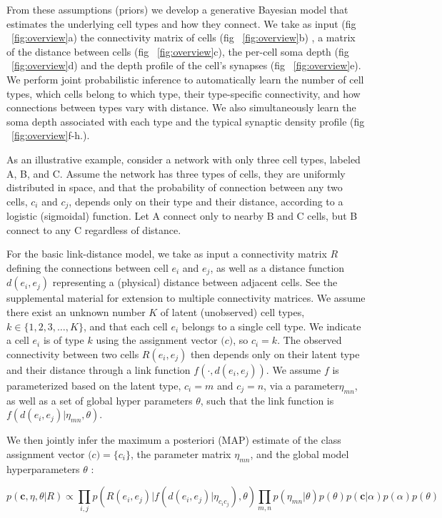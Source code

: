 \documentclass{article}
\renewcommand{\vec}[1]{\mathbf{#1}}
\begin{document}
From these assumptions (priors) we develop a generative Bayesian model
that estimates the underlying cell types and how they connect. We take
as input (fig ~\ref{fig:overview}a) the connectivity matrix of cells
(fig ~\ref{fig:overview}b) , a matrix of the distance between cells
(fig ~\ref{fig:overview}c), the per-cell soma depth (fig
~\ref{fig:overview}d) and the depth profile of the cell's synapses
(fig ~\ref{fig:overview}e). We perform joint probabilistic inference
to automatically learn the number of cell types, which cells belong to
which type, their type-specific connectivity, and how connections
between types vary with distance. We also simultaneously learn the
soma depth associated with each type and the typical synaptic density
profile (fig ~\ref{fig:overview}f-h.).


As an illustrative example, consider a network with only three cell
types, labeled A, B, and C. Assume the network has three types of
cells, they are uniformly distributed in space, and that the
probability of connection between any two cells, $c_i$ and $c_j$,
depends only on their type and their distance, according to a logistic
(sigmoidal) function. Let A connect only to nearby B and C cells, but B
connect to any C regardless of distance. 


For the basic link-distance model, we take as input a connectivity
matrix $R$ defining the connections between cell $e_i$ and $e_j$, as
well as a distance function $d(e_i, e_j)$ representing a (physical)
distance between adjacent cells.  See
the supplemental material for extension to multiple connectivity
matrices. We assume there exist an unknown number $K$ of latent
(unobserved) cell types, $k \in \{1, 2, 3, \dots, K\}$, and that each
cell $e_i$ belongs to a single cell type. We indicate a cell $e_i$ is
of type $k$ using the assignment vector $\vec(c)$, so $c_i = k$. The
observed connectivity between two cells $R(e_i, e_j)$ then depends
only on their latent type and their distance through a link function
$f(\cdot, d(e_i, e_j))$. We assume $f$ is parameterized based on the
latent type, $c_i=m$ and $c_j=n$, via a parameter$\eta_{mn}$, as well
as a set of global hyper parameters $\theta$, such that the link
function is $f(d(e_i, e_j) | \eta_{mn}, \theta)$.

We then jointly infer the maximum a posteriori (MAP) estimate of the
class assignment vector $\vec(c) = \{c_i\}$, the parameter matrix
$\eta_{mn}$, and the global model hyperparameters $\theta$ :

\begin{equation}
  p(\vec{c}, \eta, \theta | R ) \propto \prod_{i, j} p(R(e_i, e_j) | f(d(e_i, e_j) | \eta_{c_ic_j}), \theta) \prod_{m, n} p(\eta_{mn} | \theta)  p(\theta) p(\vec{c} | \alpha) p(\alpha) p(\theta)
\end{equation}
\end{document}
